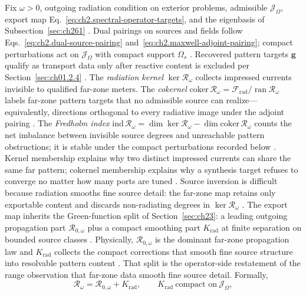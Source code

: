 Fix $\omega>0$, outgoing radiation condition on exterior problems, admissible
$\mathcal{J}_\Omega$, export map Eq.~\eqref{eq:ch2.spectral-operator-targets}, and the
eigenbasis of Subsection~\ref{sec:ch261} \cite{stratton1941}. Dual pairings on sources and fields
follow Eqs.~\eqref{eq:ch2.dual-source-pairing} and~\eqref{eq:ch2.maxwell-adjoint-pairing};
compact perturbations act on $\mathcal{J}_\Omega$ with compact support $\Omega_s$
\cite{harrington2001}. Recovered pattern targets $\mathbf{g}$ qualify as transport data only
after reactive content is excluded per Section~\ref{sec:ch01.2.4} \cite{stratton1941}.
The \emph{radiation kernel} $\ker\mathcal{R}_\omega$ collects impressed currents invisible to
qualified far-zone meters. The \emph{cokernel}
$\mathrm{coker}\,\mathcal{R}_\omega=\mathcal{F}_{\mathrm{rad}}/\operatorname{ran}\mathcal{R}_\omega$
labels far-zone pattern targets that no admissible source can realize---equivalently, directions
orthogonal to every radiative image under the adjoint pairing \cite{stratton1941}. The
\emph{Fredholm index}
$\mathrm{ind}\,\mathcal{R}_\omega=\dim\ker\mathcal{R}_\omega-\dim\mathrm{coker}\,\mathcal{R}_\omega$
counts the net imbalance between invisible source degrees and unreachable pattern obstructions;
it is stable under the compact perturbations recorded below \cite{harrington2001}. Kernel
membership explains why two distinct impressed currents can share the same far pattern;
cokernel membership explains why a synthesis target refuses to converge no matter how many ports
are tuned \cite{stratton1941}.
Source inversion is difficult because radiation smooths fine source detail: the far-zone map
retains only exportable content and discards non-radiating degrees in $\ker\mathcal{R}_\omega$
\cite{devaney2004}. The export map inherits the Green-function split of Section~\ref{sec:ch23}: a leading outgoing
propagation part $\mathcal{R}_{0,\omega}$ plus a compact smoothing part $K_{\mathrm{rad}}$ at
finite separation on bounded source classes \cite{stratton1941}. Physically,
$\mathcal{R}_{0,\omega}$ is the dominant far-zone propagation law and $K_{\mathrm{rad}}$ collects
the compact corrections that smooth fine source structure into resolvable pattern content
\cite{harrington2001}. That split is the operator-side restatement of the range observation that
far-zone data smooth fine source detail. Formally,
\begin{equation}
\label{eq:ch2.radiation-fredholm-decomposition}
\mathcal{R}_\omega
=
\mathcal{R}_{0,\omega}+K_{\mathrm{rad}},
\qquad
K_{\mathrm{rad}}\ \text{compact on}\ \mathcal{J}_\Omega,
\end{equation}
